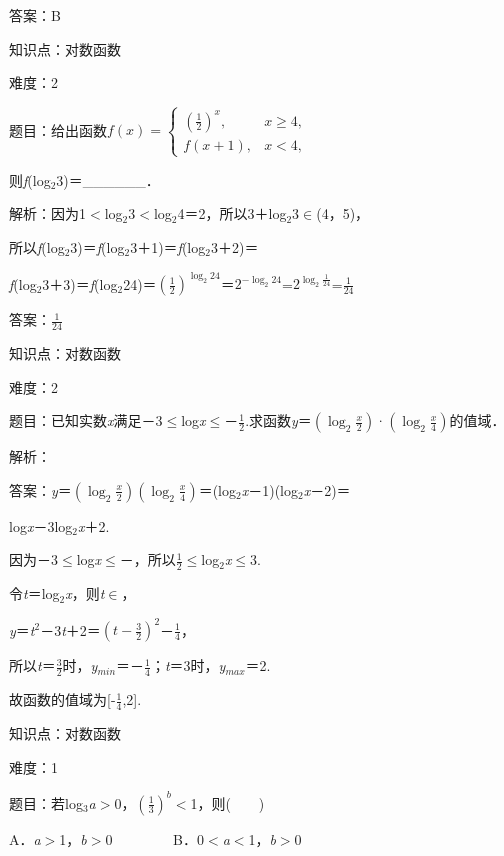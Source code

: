 \documentclass{article} %
\begin{document}
答案：B

知识点：对数函数

难度：2

题目：给出函数$ f(x)=\left\{
\begin{array}{ll}
(\frac{1}{2})^{x},&x\geq 4,\\
f(x+1),&x<4,
\end{array}
\right.
$

则\textit{f}(log${}_{2}$3)＝\_\_\_\_\_\_．

解析：因为1$\mathrm{<}$log${}_{2}$3$\mathrm{<}$log${}_{2}$4＝2，所以3＋log${}_{2}$3$\mathrm{\in}$(4，5)，

所以\textit{f}(log${}_{2}$3)＝\textit{f}(log${}_{2}$3＋1)＝\textit{f}(log${}_{2}$3＋2)＝

\textit{f}(log${}_{2}$3＋3)＝\textit{f}(log${}_{2}$24)＝$(\frac{1}{2})^{\log_2 24}$＝$2^{-\log_2 24}$=$2^{\log_2 \frac{1}{24}}$=$\frac{1}{24}$

答案：$\frac{1}{24}$


知识点：对数函数

难度：2

题目：已知实数\textit{x}满足－3$\mathrm{\le}$log\textit{x}$\mathrm{\le}$－$\frac{1}{2}$.求函数\textit{y}＝$(\log_2 \frac{x}{2})$·$(\log_2 \frac{x}{4})$的值域．

解析：

答案：\textit{y}＝$(\log_2 \frac{x}{2})(\log_2 \frac{x}{4})$＝(log${}_{2}$\textit{x}－1)(log${}_{2}$\textit{x}－2)＝

log\textit{x}－3log${}_{2}$\textit{x}＋2.

因为－3$\mathrm{\le}$log\textit{x}$\mathrm{\le}$－，所以$\frac{1}{2}$$\mathrm{\le}$log${}_{2}$\textit{x}$\mathrm{\le}$3.

令\textit{t}＝log${}_{2}$\textit{x}，则\textit{t}$\mathrm{\in}$，

\textit{y}＝\textit{t}${}^{2}$－3\textit{t}＋2＝$(t-\frac{3}{2})^{2}$－$\frac{1}{4}$，

所以\textit{t}＝$\frac{3}{2}$时，\textit{y}${}_{min}$＝－$\frac{1}{4}$；\textit{t}＝3时，\textit{y}${}_{max}$＝2.

故函数的值域为[-$\frac{1}{4}$,2].

知识点：对数函数

难度：1

题目：若log${}_{3}$\textit{a}$\mathrm{>}$0，$(\frac{1}{3})^{b}$$\mathrm{<}$1，则(　　)

A．\textit{a}$\mathrm{>}$1，\textit{b}$\mathrm{>}$0　　　　 B．0$\mathrm{<}$\textit{a}$\mathrm{<}$1，\textit{b}$\mathrm{>}$0
\end{document}
